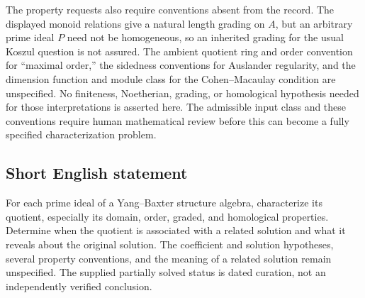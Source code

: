 \documentclass[11pt]{article}
\begin{document}
The property requests also require conventions absent from the record. The displayed monoid relations give a natural length grading on \(A\), but an arbitrary prime ideal \(P\) need not be homogeneous, so an inherited grading for the usual Koszul question is not assured. The ambient quotient ring and order convention for ``maximal order,'' the sidedness conventions for Auslander regularity, and the dimension function and module class for the Cohen--Macaulay condition are unspecified. No finiteness, Noetherian, grading, or homological hypothesis needed for those interpretations is asserted here. The admissible input class and these conventions require human mathematical review before this can become a fully specified characterization problem.
\subsection{Short English statement}
For each prime ideal of a Yang--Baxter structure algebra, characterize its quotient, especially its domain, order, graded, and homological properties. Determine when the quotient is associated with a related solution and what it reveals about the original solution. The coefficient and solution hypotheses, several property conventions, and the meaning of a related solution remain unspecified. The supplied partially solved status is dated curation, not an independently verified conclusion.
\end{document}
